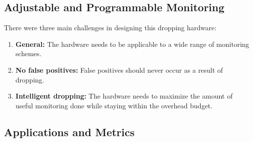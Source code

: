 \subsection{Adjustable and Programmable Monitoring}

There were three main challenges in designing this dropping hardware:
\begin{enumerate}
  \item \textbf{General:} The hardware needs to be applicable to a wide range of monitoring schemes.
  \item \textbf{No false positives:} False positives should never occur as a result of dropping.
  \item \textbf{Intelligent dropping:} The hardware needs to maximize the amount of useful monitoring done while staying within the overhead budget.
\end{enumerate}


\subsection{Applications and Metrics}


